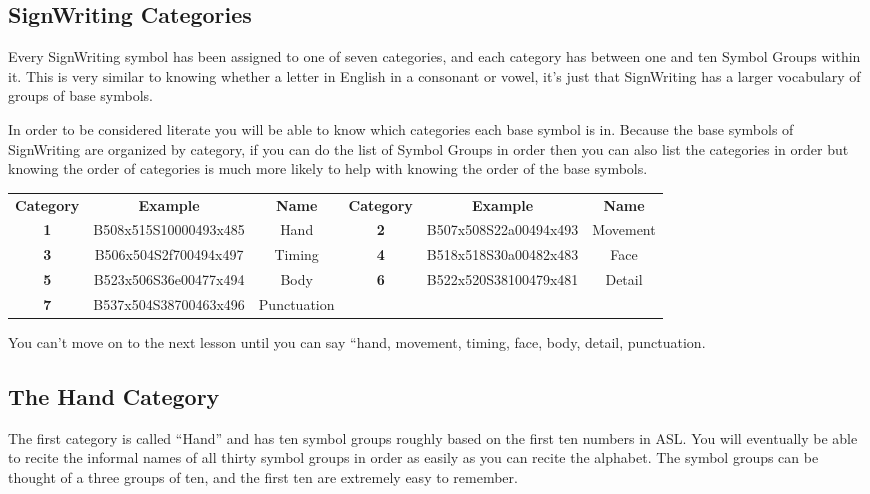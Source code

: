 \documentclass{article}
\begin{document}
\subsection{SignWriting Categories}

Every SignWriting symbol has been assigned to one of seven categories, and each category has between one and ten Symbol Groups within it.
This is very similar to knowing whether a letter in English in a consonant or vowel, it's just that SignWriting has a larger vocabulary of groups of base symbols.

In order to be considered literate you will be able to know which categories each base symbol is in.
Because the base symbols of SignWriting are organized by category, if you can do the list of Symbol Groups in order then you can also list the categories in order but knowing the order of categories is much more likely to help with knowing the order of the base symbols.

\begin{center}
\begin{tabular}{ccc@{\hskip 2cm}ccc}
\textbf{Category}&\textbf{Example}&\textbf{Name}&\textbf{Category}&\textbf{Example}&\textbf{Name}\\
\textbf{1}&B508x515S10000493x485&Hand       &\textbf{2}&B507x508S22a00494x493&Movement\\
\textbf{3}&B506x504S2f700494x497&Timing     &\textbf{4}&B518x518S30a00482x483&Face    \\
\textbf{5}&B523x506S36e00477x494&Body       &\textbf{6}&B522x520S38100479x481&Detail  \\
\textbf{7}&B537x504S38700463x496&Punctuation\\
\end{tabular}
\end{center}

You can't move on to the next lesson until you can say ``hand, movement, timing, face, body, detail, punctuation.

\subsection{The Hand Category}

The first category is called ``Hand'' and has ten symbol groups roughly based on the first ten numbers in ASL.
You will eventually be able to recite the informal names of all thirty symbol groups in order as easily as you can recite the alphabet.
The symbol groups can be thought of a three groups of ten, and the first ten are extremely easy to remember.
\end{document}
